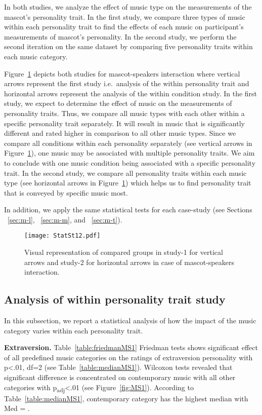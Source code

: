 In both studies, we analyze the effect of music type on the measurements of the mascot’s personality trait.
In the first study, we compare three types of music within each personality trait
to find the effects of each music on participant's measurements of mascot's personality.
In the second study, we perform the second iteration on the same dataset by comparing five personality traits
within each music category.

Figure~\ref{fig:Stat12} depicts both studies for mascot-speakers interaction where vertical arrows represent the first study
i.e.\ analysis of the within personality trait and horizontal arrows represent the analysis of the within condition study.
In the first study, we expect to determine the effect of music on the measurements of personality traits.
Thus, we compare all music types with each other within a specific personality trait separately.
It will result in music that is significantly different and rated higher in comparison to all other music types.
Since we compare all conditions within each personality separately (see vertical arrows in Figure~\ref{fig:Stat12}),
one music may be associated with multiple personality traits.
We aim to conclude with one music condition being associated with a specific personality trait.
In the second study, we compare all personality traits within each music type (see horizontal
arrows in Figure~\ref{fig:Stat12}) which helps us to find personality trait that is conveyed by specific music most.

In addition, we apply the same statistical tests for each case-study
(see Sections ~\ref{sec:m-l}, ~\ref{sec:m-m}, and ~\ref{sec:m-t}).

\begin{figure}[H]
    \centering
    \texttt{[image: StatSt12.pdf]}
    \caption{Visual representation of compared groups in study-1 for vertical arrows and
    study-2 for horizontal arrows in case of mascot-speakers interaction.}
    \label{fig:Stat12}
\end{figure}
\subsection{Analysis of within personality trait study}
\label{subsec:MSstudy1}
In this subsection, we report a statistical analysis of how the impact of the music category varies within each
personality trait.

\par\textbf{Extraversion.}
Table~\ref{table:friedmanMS1} Friedman tests shows significant effect of all predefined music categories on the
ratings of extraversion personality with p<.01, df=2 (see Table~\ref{table:medianMS1}).
Wilcoxon tests revealed that significant difference is concentrated on contemporary music
with all other categories with p\textsubscript{adj}<.01 (see Figure~\ref{fig:MS1}).
According to Table~\ref{table:medianMS1}, contemporary category has the highest median with Med = .

